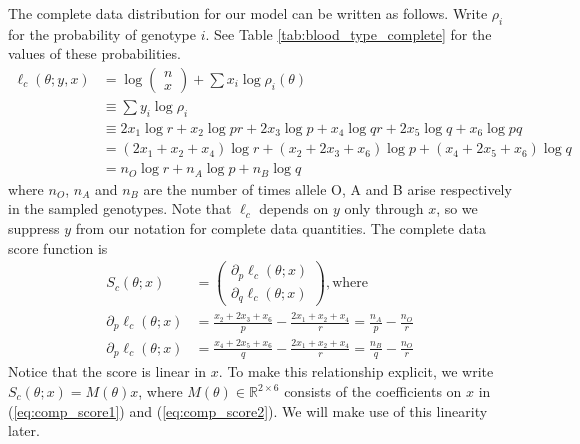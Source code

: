 \documentclass[11pt, oneside]{article}   	%
\newcommand{\bR}{\mathbb{R}}
\begin{document}
\begin{appendices}
    The complete data distribution for our model can be written as follows. Write $\rho_i$ for the probability of genotype $i$. See Table \ref{tab:blood_type_complete} for the values of these probabilities.
    \begin{align}
        \ell_c(\theta; y,x) &= \log \begin{pmatrix} n \\ x \end{pmatrix} + \sum x_i \log \rho_i(\theta)\\
        & \equiv \sum y_i \log \rho_i\\
        &\equiv 2 x_1 \log r + x_2 \log pr + 2 x_3 \log p + x_4 \log qr + 2 x_5 \log q + x_6 \log pq\\
        &= (2 x_1 + x_2 + x_4) \log r + (x_2 + 2 x_3 + x_6) \log p + (x_4 + 2 x_5 + x_6) \log q\\
        &= n_O \log r + n_A \log p + n_B \log q
    \end{align}
    where $n_O$, $n_A$ and $n_B$ are the number of times allele O, A and B arise respectively in the sampled genotypes. Note that $\ell_c$ depends on $y$ only through $x$, so we suppress $y$ from our notation for complete data quantities. The complete data score function is
    \begin{align}
        S_c(\theta; x) &= \begin{pmatrix}
            \partial_p \ell_c(\theta; x)\\
            \partial_q \ell_c(\theta; x) 
        \end{pmatrix} \mathrm{, where}\\
        \partial_p \ell_c(\theta; x) &= \frac{x_2 + 2 x_3 + x_6}{p} - \frac{2x_1 + x_2 + x_4}{r} = \frac{n_A}{p} - \frac{n_O}{r} \label{eq:comp_score1}\\
        \partial_p \ell_c(\theta; x) &= \frac{x_4 + 2 x_5 + x_6}{q} - \frac{2x_1 + x_2 + x_4}{r} = \frac{n_B}{q} - \frac{n_O}{r} \label{eq:comp_score2}
    \end{align}
    Notice that the score is linear in $x$. To make this relationship explicit, we write $S_c(\theta; x) = M(\theta) x$, where $M(\theta) \in \bR^{2 \times 6}$ consists of the coefficients on $x$ in (\ref{eq:comp_score1}) and (\ref{eq:comp_score2}). We will make use of this linearity later.


\end{appendices}
\end{document}

